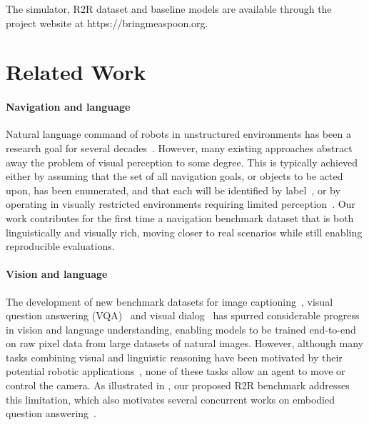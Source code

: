 \documentclass[10pt,twocolumn,letterpaper]{article}
\begin{document}
\noindent
The simulator, R2R dataset and baseline models are available through the project website at https://bringmeaspoon.org. \section{Related Work}

\paragraph{Navigation and language}
Natural language command of robots in unstructured environments has been a research goal for several decades~\cite{winograd1971procedures}. However, many existing approaches abstract away the problem of visual perception to some degree. This is typically achieved either by assuming that the set of all navigation goals, or objects to be acted upon, has been enumerated, and that each will be identified by label~\cite{chen2011learning, tellex2011understanding}, or by operating in visually restricted environments requiring limited perception~\cite{chaplot2017gated,guadarrama2013grounding,huang2010natural,kollar2010toward,macmahon2006walk,mei2016listen,vogel2010learning}. Our work contributes for the first time a navigation benchmark dataset that is both linguistically and visually rich, moving closer to real scenarios while still enabling reproducible evaluations.  

\vspace{-0.3cm}
\paragraph{Vision and language}
The development of new benchmark datasets for image captioning~\cite{Chen2015}, visual question answering (VQA)~\cite{VQA,balanced_vqa_v2} and visual dialog~\cite{visualdialog} has spurred considerable progress in vision and language understanding, enabling models to be trained end-to-end on raw pixel data from large datasets of natural images. However, although many tasks combining visual and linguistic reasoning have been motivated by their potential robotic applications~\cite{VQA, visualdialog,KazemzadehOrdonezMattenBergEMNLP14,mao2015generation,MovieQA}, none of these tasks allow an agent to move or control the camera. As illustrated in , our proposed R2R benchmark addresses this limitation, which also motivates several concurrent works on embodied question answering~\cite{embodiedqa, iqa}. 

\vspace{-0.3cm}
\end{document}
